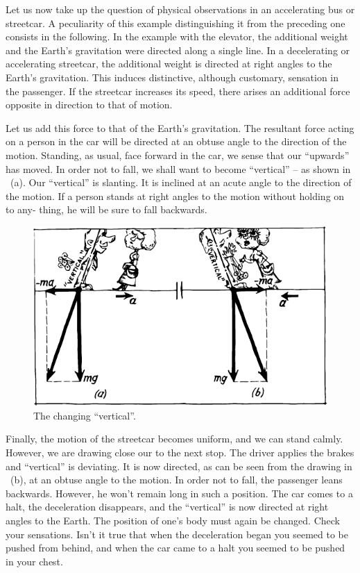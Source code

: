 Let us now take up the question of physical observations in an accelerating bus or streetcar. A peculiarity of
this example distinguishing it from the preceding one
consists in the following. In the example with the elevator, the additional weight and the Earth's gravitation
were directed along a single line. In a decelerating or
accelerating streetcar, the additional weight is directed
at right angles to the Earth's gravitation. This induces
distinctive, although customary, sensation in the passenger. If the streetcar increases its speed, there arises
an additional force opposite in direction to that of motion.

Let us add this force to that of the Earth's gravitation.
The resultant force acting on a person in the car will be
directed at an obtuse angle to the direction of the motion.
Standing, as usual, face forward in the car, we sense
that our ``upwards'' has moved. In order not to fall, we
shall want to become ``vertical'' -- as shown in ~\textcolor{black!70}{(a)}.
Our ``vertical'' is slanting. It is inclined at an acute angle
to the direction of the motion. If a person stands at
right angles to the motion without holding on to any-
thing, he will be sure to fall backwards.

\begin{figure}[!ht]
\centering
\includegraphics[width=\textwidth]{figures/fig-02-08.pdf}
\caption{The changing ``vertical''.}
\label{fig-2.08}
\end{figure}


Finally, the motion of the streetcar becomes uniform,
and we can stand calmly. However, we are drawing close
our to the next stop. The driver applies the brakes and
``vertical'' is deviating. It is now directed, as can be seen
from the drawing in ~\textcolor{black!70}{(b)}, at an obtuse angle to
the motion. In order not to fall, the passenger leans
backwards. However, he won't remain long in such
a position. The car comes to a halt, the deceleration
disappears, and the ``vertical'' is now directed at right
angles to the Earth. The position of one's body must
again be changed. Check your sensations. Isn't it true
that when the deceleration began you seemed to be pushed from behind, and when the car came to a halt you seemed to be pushed in your chest.

